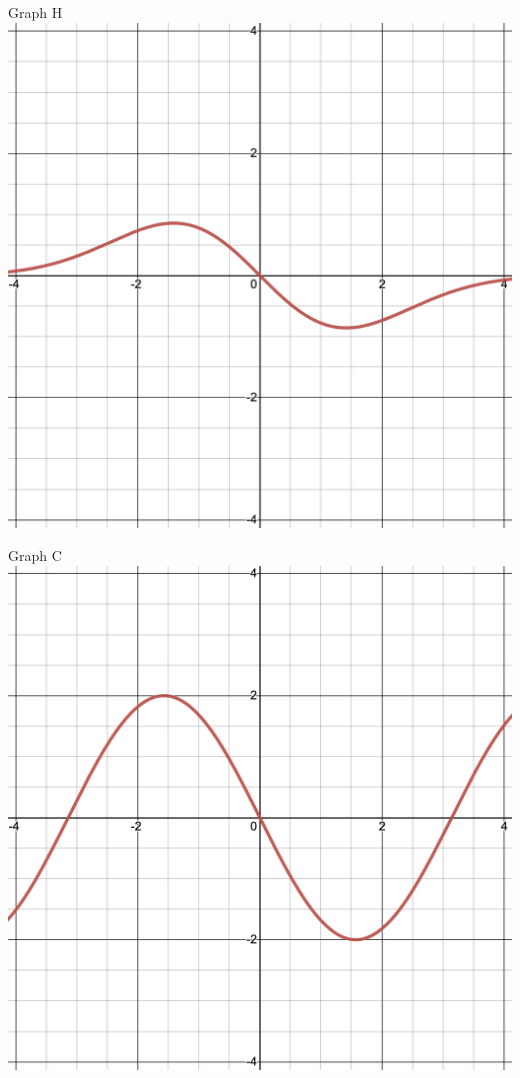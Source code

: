 \documentclass{siproblemset}
\begin{document}
\begin{multipartquestion}
\begin{multicols}{3}
\begin{center}
            \end{center}
            \begin{center}
                Graph H
                \includegraphics[width=\linewidth]{img/pt2-graph3b}
            \end{center}
            \begin{center}
                Graph C
                \includegraphics[width=\linewidth]{img/pt2-graph3i}

\end{center}
\end{multicols}
\end{multipartquestion}
\end{document}
